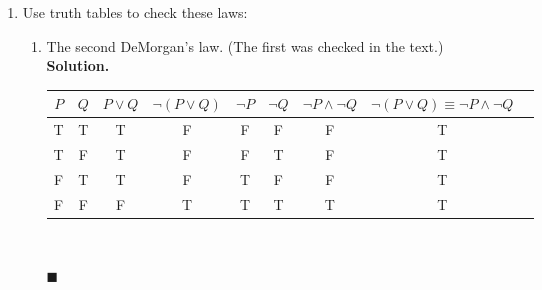 \documentclass{report}
\newcommand{\sol}{\vspace{1em}\\\textbf{Solution.}\vspace{0.5em}}
\newcommand{\qed}{\ \\\strut\hfill$\blacksquare$\vspace{1em}}
\begin{document}
\begin{enumerate}[leftmargin=*]
    \item Use truth tables to check these laws:
          \begin{enumerate}
              \item The second DeMorgan's law. (The first was checked in the text.) \sol{}
                    \begin{center}
                        \begin{tabular}{ccccccccc}
                            $P$ & $Q$ & $P \vee Q$ & $\neg(P \vee Q)$ & $\neg P$ & $\neg Q$ & $\neg P \wedge \neg Q$ & $\neg(P \vee Q) \equiv \neg P \wedge \neg Q$ \\
                            \hline
                            T   & T   & T          & F                & F        & F        & F                      & T                                            \\
                            T   & F   & T          & F                & F        & T        & F                      & T                                            \\
                            F   & T   & T          & F                & T        & F        & F                      & T                                            \\
                            F   & F   & F          & T                & T        & T        & T                      & T
                        \end{tabular}
                    \end{center} \qed


\end{enumerate}
\end{enumerate}
\end{document}
